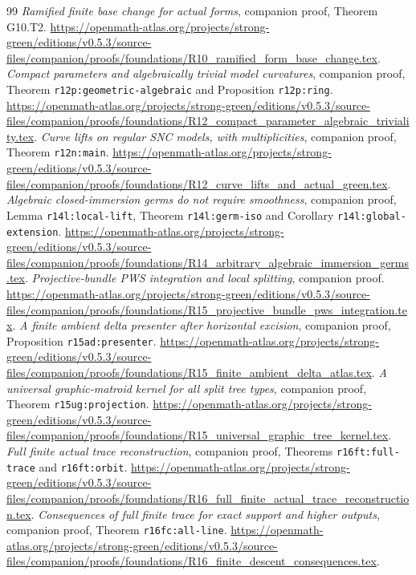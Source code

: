 \documentclass[11pt,a4paper]{article}
\theoremstyle{definition}
\theoremstyle{remark}
\numberwithin{equation}{section}
\begin{document}
\begin{thebibliography}{99}
 \emph{Ramified finite base change for actual forms}, companion proof, Theorem G10.T2. \url{https://openmath-atlas.org/projects/strong-green/editions/v0.5.3/source-files/companion/proofs/foundations/R10_ramified_form_base_change.tex}.
 \emph{Compact parameters and algebraically trivial model curvatures}, companion proof, Theorem \texttt{r12p:geometric-algebraic} and Proposition \texttt{r12p:ring}. \url{https://openmath-atlas.org/projects/strong-green/editions/v0.5.3/source-files/companion/proofs/foundations/R12_compact_parameter_algebraic_triviality.tex}.
 \emph{Curve lifts on regular SNC models, with multiplicities}, companion proof, Theorem \texttt{r12n:main}. \url{https://openmath-atlas.org/projects/strong-green/editions/v0.5.3/source-files/companion/proofs/foundations/R12_curve_lifts_and_actual_green.tex}.
 \emph{Algebraic closed-immersion germs do not require smoothness}, companion proof, Lemma \texttt{r14l:local-lift}, Theorem \texttt{r14l:germ-iso} and Corollary \texttt{r14l:global-extension}. \url{https://openmath-atlas.org/projects/strong-green/editions/v0.5.3/source-files/companion/proofs/foundations/R14_arbitrary_algebraic_immersion_germs.tex}.
 \emph{Projective-bundle PWS integration and local splitting}, companion proof. \url{https://openmath-atlas.org/projects/strong-green/editions/v0.5.3/source-files/companion/proofs/foundations/R15_projective_bundle_pws_integration.tex}.
 \emph{A finite ambient delta presenter after horizontal excision}, companion proof, Proposition \texttt{r15ad:presenter}. \url{https://openmath-atlas.org/projects/strong-green/editions/v0.5.3/source-files/companion/proofs/foundations/R15_finite_ambient_delta_atlas.tex}.
 \emph{A universal graphic-matroid kernel for all split tree types}, companion proof, Theorem \texttt{r15ug:projection}. \url{https://openmath-atlas.org/projects/strong-green/editions/v0.5.3/source-files/companion/proofs/foundations/R15_universal_graphic_tree_kernel.tex}.
 \emph{Full finite actual trace reconstruction}, companion proof, Theorems \texttt{r16ft:full-trace} and \texttt{r16ft:orbit}. \url{https://openmath-atlas.org/projects/strong-green/editions/v0.5.3/source-files/companion/proofs/foundations/R16_full_finite_actual_trace_reconstruction.tex}.
 \emph{Consequences of full finite trace for exact support and higher outputs}, companion proof, Theorem \texttt{r16fc:all-line}. \url{https://openmath-atlas.org/projects/strong-green/editions/v0.5.3/source-files/companion/proofs/foundations/R16_finite_descent_consequences.tex}.

\end{thebibliography}
\end{document}

